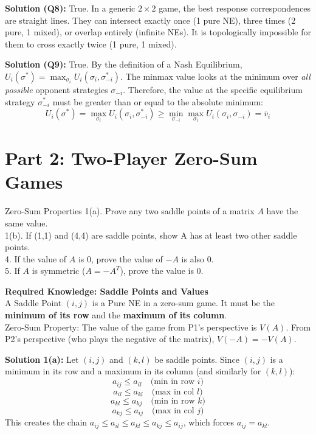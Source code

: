 \documentclass[12pt, a4paper]{article}
\begin{document}
\textbf{Solution (Q8):} True. In a generic $2 \times 2$ game, the best response correspondences are straight lines. They can intersect exactly once (1 pure NE), three times (2 pure, 1 mixed), or overlap entirely (infinite NEs). It is topologically impossible for them to cross exactly twice (1 pure, 1 mixed).

\textbf{Solution (Q9):} True. By the definition of a Nash Equilibrium, $U_i(\sigma^*) = \max_{\sigma_i} U_i(\sigma_i, \sigma_{-i}^*)$. 
The minmax value looks at the minimum over \textit{all possible} opponent strategies $\sigma_{-i}$. 
Therefore, the value at the specific equilibrium strategy $\sigma_{-i}^*$ must be greater than or equal to the absolute minimum:
\[ U_i(\sigma^*) = \max_{\sigma_i} U_i(\sigma_i, \sigma_{-i}^*) \geq \min_{\sigma_{-i}} \max_{\sigma_i} U_i(\sigma_i, \sigma_{-i}) = \bar{v}_i \]

\newpage
\section*{Part 2: Two-Player Zero-Sum Games}

\begin{exbox}{Zero-Sum Properties}
1(a). Prove any two saddle points of a matrix $A$ have the same value. \\
1(b). If (1,1) and (4,4) are saddle points, show A has at least two other saddle points. \\
4. If the value of $A$ is 0, prove the value of $-A$ is also 0. \\
5. If $A$ is symmetric ($A = -A^T$), prove the value is 0.
\end{exbox}

\begin{notebox}
\textbf{Required Knowledge: Saddle Points and Values} \\
A Saddle Point $(i,j)$ is a Pure NE in a zero-sum game. It must be the \textbf{minimum of its row} and the \textbf{maximum of its column}. \\
Zero-Sum Property: The value of the game from P1's perspective is $V(A)$. From P2's perspective (who plays the negative of the matrix), $V(-A) = -V(A)$.
\end{notebox}

\textbf{Solution 1(a):} Let $(i,j)$ and $(k,l)$ be saddle points. Since $(i,j)$ is a minimum in its row and a maximum in its column (and similarly for $(k,l)$):
\[ a_{ij} \leq a_{il} \quad \text{(min in row } i \text{)} \]
\[ a_{il} \leq a_{kl} \quad \text{(max in col } l \text{)} \]
\[ a_{kl} \leq a_{kj} \quad \text{(min in row } k \text{)} \]
\[ a_{kj} \leq a_{ij} \quad \text{(max in col } j \text{)} \]
This creates the chain $a_{ij} \leq a_{il} \leq a_{kl} \leq a_{kj} \leq a_{ij}$, which forces $a_{ij} = a_{kl}$.
\end{document}
